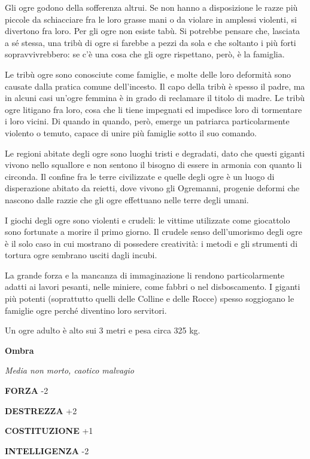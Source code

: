 \begin{multicols}{2}
Gli ogre godono della sofferenza altrui. Se non hanno a disposizione le razze più piccole da schiacciare fra le loro grasse mani o da violare in amplessi violenti, si divertono fra loro. Per gli ogre non esiste tabù. Si potrebbe pensare che, lasciata a sé stessa, una tribù di ogre si farebbe a pezzi da sola e che soltanto i più forti sopravvivrebbero: se c'è una cosa che gli ogre rispettano, però, è la famiglia.

Le tribù ogre sono conosciute come famiglie, e molte delle loro deformità sono causate dalla pratica comune dell'incesto. Il capo della tribù è spesso il padre, ma in alcuni casi un'ogre femmina è in grado di reclamare il titolo di madre. Le tribù ogre litigano fra loro, cosa che li tiene impegnati ed impedisce loro di tormentare i loro vicini. Di quando in quando, però, emerge un patriarca particolarmente violento o temuto, capace di unire più famiglie sotto il suo comando.

Le regioni abitate degli ogre sono luoghi tristi e degradati, dato che questi giganti vivono nello squallore e non sentono il bisogno di essere in armonia con quanto li circonda. Il confine fra le terre civilizzate e quelle degli ogre è un luogo di disperazione abitato da reietti, dove vivono gli Ogremanni, progenie deformi che nascono dalle razzie che gli ogre effettuano nelle terre degli umani.

I giochi degli ogre sono violenti e crudeli: le vittime utilizzate come giocattolo sono fortunate a morire il primo giorno. Il crudele senso dell'umorismo degli ogre è il solo caso in cui mostrano di possedere creatività: i metodi e gli strumenti di tortura ogre sembrano usciti dagli incubi.

La grande forza e la mancanza di immaginazione li rendono particolarmente adatti ai lavori pesanti, nelle miniere, come fabbri o nel disboscamento. I giganti più potenti (soprattutto quelli delle Colline e delle Rocce) spesso soggiogano le famiglie ogre perché diventino loro servitori.

Un ogre adulto è alto sui 3 metri e pesa circa 325 kg.


\medskip{}\textbf{Ombra}

\textit{Media non morto, caotico malvagio}

\textbf{FORZA} -2

\textbf{DESTREZZA} +2

\textbf{COSTITUZIONE} +1

\textbf{INTELLIGENZA} -2


\end{multicols}
